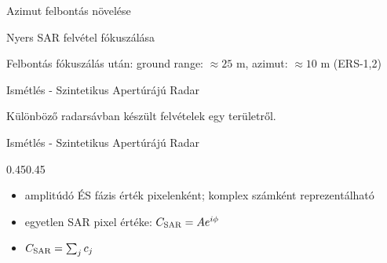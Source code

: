 \def\ft{Azimut felbontás növelése}

\begin{frame}{\ft}
    \begin{center}
    \begin{minipage}[c]{0.45\textwidth}
    \end{minipage}
    \hspace{10pt}
    \begin{minipage}[c]{0.45\textwidth}
    \end{minipage}
    \end{center}
\end{frame}


\def\ft{Nyers SAR felvétel fókuszálása}

\begin{frame}{\ft}
    \begin{minic}{0.75}
        
        \centering
        Felbontás fókuszálás után: ground range: $\approx 25$ m, azimut: $\approx 10$ m (ERS-1,2)
    \end{minic}
\end{frame}


\def\ft{Ismétlés - Szintetikus Apertúrájú Radar}

\begin{frame}{\ft}
    \begin{minic}{0.85}
        
        \centering
        Különböző radarsávban készült felvételek egy területről.
    \end{minic}
\end{frame}


\begin{frame}{\ft}
    \begin{figp}{}{}{0.45}{0.45}
        \begin{itemize}
            \item amplitúdó ÉS fázis érték pixelenként; komplex számként reprezentálható
            \item egyetlen SAR pixel értéke: $C_{\text{SAR}} = A e^{i\phi}$
            \item $C_{\text{SAR}} = \sum_j c_j$
        \end{itemize}
    \end{figp}
\end{frame}


